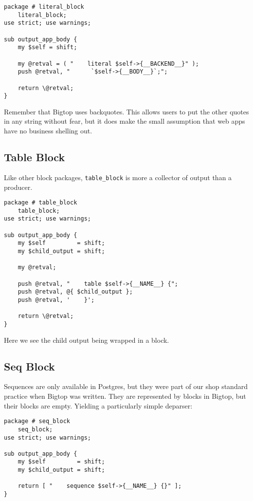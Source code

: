 \begin{verbatim}
package # literal_block
    literal_block;
use strict; use warnings;

sub output_app_body {
    my $self = shift;

    my @retval = ( "    literal $self->{__BACKEND__}" );
    push @retval, "      `$self->{__BODY__}`;";

    return \@retval;
}

\end{verbatim}

Remember that Bigtop uses backquotes.  This allows users to put the other
quotes in any string without fear, but it does make the small assumption
that web apps have no business shelling out.

\subsection*{Table Block}

Like other block packages, \verb+table_block+ is more a collector of
output than a producer.

\begin{verbatim}
package # table_block
    table_block;
use strict; use warnings;

sub output_app_body {
    my $self         = shift;
    my $child_output = shift;

    my @retval;

    push @retval, "    table $self->{__NAME__} {";
    push @retval, @{ $child_output };
    push @retval, '    }';

    return \@retval;
}
\end{verbatim}

Here we see the child output being wrapped in a block.

\subsection*{Seq Block}

Sequences are only available in Postgres, but they were part of our
shop standard practice when Bigtop was written.  They are represented
by blocks in Bigtop, but their blocks are empty.  Yielding a particularly
simple deparser:

\begin{verbatim}
package # seq_block
    seq_block;
use strict; use warnings;

sub output_app_body {
    my $self         = shift;
    my $child_output = shift;

    return [ "    sequence $self->{__NAME__} {}" ];
}
\end{verbatim}

